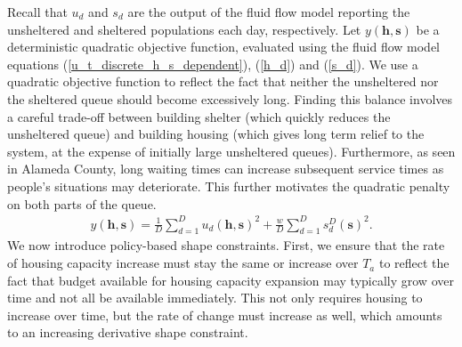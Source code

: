 \documentclass[12pt,a4paper]{article}
\begin{document}
Recall that $u_d$ and $s_d$ are the output of the fluid flow model reporting the unsheltered and sheltered populations each day, respectively.  Let $y(\boldsymbol{h},\boldsymbol{s})$ be a deterministic quadratic objective function, evaluated using the fluid flow model equations (\ref{u_t_discrete_h_s_dependent}), (\ref{h_d}) and (\ref{s_d}). We use a quadratic objective function to reflect the fact that neither the unsheltered nor the sheltered queue should become excessively long. Finding this balance involves a careful trade-off between building shelter (which quickly reduces the unsheltered queue) and building housing (which gives long term relief to the system, at the expense of initially large unsheltered queues). Furthermore, as seen in Alameda County, long waiting times can increase subsequent service times as people's situations may deteriorate. This further motivates the quadratic penalty on both parts of the queue.
%
\begin{align} \label{y}
  y(\boldsymbol{h},\boldsymbol{s}) = \frac{1}{D} \sum_{d=1}^{D} u_d(\boldsymbol{h},\boldsymbol{s})^2 + \frac{w}{D} \sum_{d=1}^{D} s^D_d(\boldsymbol{s})^2.  
\end{align}
%
We now introduce policy-based shape constraints. First, we ensure that the rate of housing capacity increase must stay the same or increase over $T_a$ to reflect the fact that budget available for housing capacity expansion may typically grow over time and not all be available immediately. This not only requires housing to increase over time, but the rate of change must increase as well, which amounts to an increasing derivative shape constraint.
\end{document}

